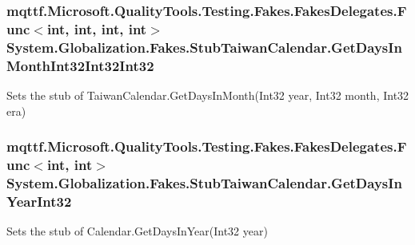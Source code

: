 \hypertarget{class_system_1_1_globalization_1_1_fakes_1_1_stub_taiwan_calendar_a46320e83e8f0cf475e08401b28fa5ee6}{
\subsubsection[{Get\-Days\-In\-Month\-Int32\-Int32\-Int32}]{\setlength{\rightskip}{0pt plus 5cm}mqttf.\-Microsoft.\-Quality\-Tools.\-Testing.\-Fakes.\-Fakes\-Delegates.\-Func$<$int, int, int, int$>$ System.\-Globalization.\-Fakes.\-Stub\-Taiwan\-Calendar.\-Get\-Days\-In\-Month\-Int32\-Int32\-Int32}}\label{class_system_1_1_globalization_1_1_fakes_1_1_stub_taiwan_calendar_a46320e83e8f0cf475e08401b28fa5ee6}


Sets the stub of Taiwan\-Calendar.\-Get\-Days\-In\-Month(\-Int32 year, Int32 month, Int32 era)

\hypertarget{class_system_1_1_globalization_1_1_fakes_1_1_stub_taiwan_calendar_a580ad21760fc6a2e17c2192261085f43}{
\subsubsection[{Get\-Days\-In\-Year\-Int32}]{\setlength{\rightskip}{0pt plus 5cm}mqttf.\-Microsoft.\-Quality\-Tools.\-Testing.\-Fakes.\-Fakes\-Delegates.\-Func$<$int, int$>$ System.\-Globalization.\-Fakes.\-Stub\-Taiwan\-Calendar.\-Get\-Days\-In\-Year\-Int32}}\label{class_system_1_1_globalization_1_1_fakes_1_1_stub_taiwan_calendar_a580ad21760fc6a2e17c2192261085f43}


Sets the stub of Calendar.\-Get\-Days\-In\-Year(\-Int32 year)

